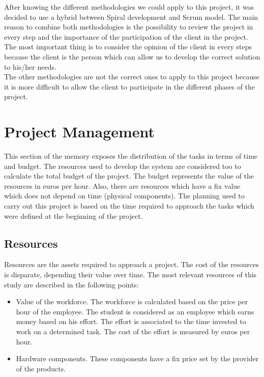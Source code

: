 After knowing the different methodologies we could apply to this project, it was decided to use a hybrid between Spiral development and Scrum model. The main reason to combine both methodologies is the possibility to review the project in every step and the importance of the participation of the client in the project. The most important thing is to consider the opinion of the client in every steps because the client is the person which can allow us to develop the correct solution to his/her needs.\\

The other methodologies are not the correct ones to apply to this project because it is more difficult to allow the client to participate in the different phases of the project.

\section{Project Management}

This section of the memory exposes the distribution of the tasks in terms of time and budget. The resources used to develop the system are considered too to calculate the total budget of the project. The budget represents the value of the resources in euros per hour. Also, there are resources which have a fix value which does not depend on time (physical components). The planning used to carry out this project is based on the time required to approach the tasks which were defined at the beginning of the project.\\

\subsection{Resources}

Resources are the assets required to approach a project. The cost of the resources is disparate, depending their value over time. The most relevant resources of this study are described in the following points:

\begin{itemize}

\item Value of the workforce. The workforce is calculated based on the price per hour of the employee. The student is considered as an employee which earns money based on his effort. The effort is associated to the time invested to work on a determined task. The cost of the effort is measured by euros per hour.
\item Hardware components. These components have a fix price set by the provider of the products.

\end{itemize}

